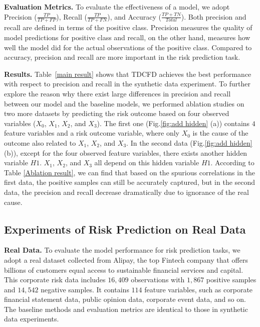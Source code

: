\documentclass[letterpaper]{article} %
\theoremstyle{definition}
\theoremstyle{remark}
\begin{document}
\noindent\textbf{Evaluation Metrics.}
To evaluate the effectiveness of a model, we adopt Precision ($\frac{TP}{TP+FP}$), Recall ($\frac{TP}{TP+FN}$), and Accuracy ($\frac{TP+TN}{Total}$). Both precision and recall are defined in terms of the positive class. Precision measures the quality of model predictions for positive class and recall, on the other hand, measures how well the model did for the actual observations of the positive class. Compared to accuracy, precision and recall are more important in the risk prediction task.


\noindent\textbf{Results.}
Table~\ref{main result} shows that TDCFD achieves the best performance with respect to precision and recall in the synthetic data experiment. To further explore the reason why there exist large differences in precision and recall between our model and the baseline models, we performed ablation studies on two more datasets by predicting the risk outcome based on four observed variables ($X_0$, $X_1$, $X_2$, and $X_3$). The first one (Fig.\ref{fig:add hidden} (a)) contains $4$ feature variables and a risk outcome variable, where only $X_0$ is the cause of the outcome also related to $X_1$, $X_2$, and $X_3$. In the second data (Fig.\ref{fig:add hidden} (b)), except for the four observed feature variables, there exists another hidden variable $H1$. $X_1$, $X_2$, and $X_3$ all depend on this hidden variable $H1$. According to Table \ref{Ablation result}, we can find that based on the spurious correlations in the first data, the positive samples can still be accurately captured, but in the second data, the precision and recall decrease dramatically due to ignorance of the real cause.

\vspace{-2.81mm}
\subsection{Experiments of Risk Prediction on Real Data}


\noindent\textbf{Real Data.}
To evaluate the model performance for risk prediction tasks, we adopt a real dataset collected from Alipay, the top Fintech company that offers billions of customers equal access to sustainable financial services and capital. This corporate risk data includes $16,409$ observations with $1,867$ positive samples and $14,542$ negative samples. It contains $114$ feature variables, such as corporate financial statement data, public opinion data, corporate event data, and so on. The baseline methods and evaluation metrics are identical to those in synthetic data experiments.
\end{document}
